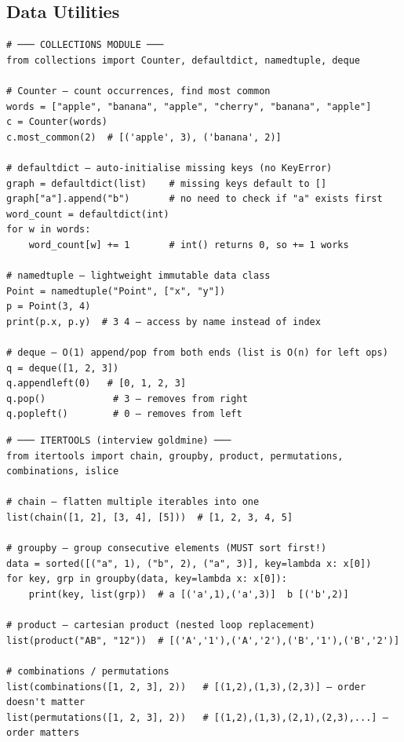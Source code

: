 \documentclass[10pt, a4paper]{article}
\begin{document}
\subsection{Data Utilities}


\begin{lstlisting}[language=mypython]
# ─── COLLECTIONS MODULE ───
from collections import Counter, defaultdict, namedtuple, deque

# Counter — count occurrences, find most common
words = ["apple", "banana", "apple", "cherry", "banana", "apple"]
c = Counter(words)
c.most_common(2)  # [('apple', 3), ('banana', 2)]

# defaultdict — auto-initialise missing keys (no KeyError)
graph = defaultdict(list)    # missing keys default to []
graph["a"].append("b")       # no need to check if "a" exists first
word_count = defaultdict(int)
for w in words:
    word_count[w] += 1       # int() returns 0, so += 1 works

# namedtuple — lightweight immutable data class
Point = namedtuple("Point", ["x", "y"])
p = Point(3, 4)
print(p.x, p.y)  # 3 4 — access by name instead of index

# deque — O(1) append/pop from both ends (list is O(n) for left ops)
q = deque([1, 2, 3])
q.appendleft(0)   # [0, 1, 2, 3]
q.pop()            # 3 — removes from right
q.popleft()        # 0 — removes from left
\end{lstlisting}


\begin{lstlisting}[language=mypython]
# ─── ITERTOOLS (interview goldmine) ───
from itertools import chain, groupby, product, permutations, combinations, islice

# chain — flatten multiple iterables into one
list(chain([1, 2], [3, 4], [5]))  # [1, 2, 3, 4, 5]

# groupby — group consecutive elements (MUST sort first!)
data = sorted([("a", 1), ("b", 2), ("a", 3)], key=lambda x: x[0])
for key, grp in groupby(data, key=lambda x: x[0]):
    print(key, list(grp))  # a [('a',1),('a',3)]  b [('b',2)]

# product — cartesian product (nested loop replacement)
list(product("AB", "12"))  # [('A','1'),('A','2'),('B','1'),('B','2')]

# combinations / permutations
list(combinations([1, 2, 3], 2))   # [(1,2),(1,3),(2,3)] — order doesn't matter
list(permutations([1, 2, 3], 2))   # [(1,2),(1,3),(2,1),(2,3),...] — order matters
\end{lstlisting}
\end{document}
